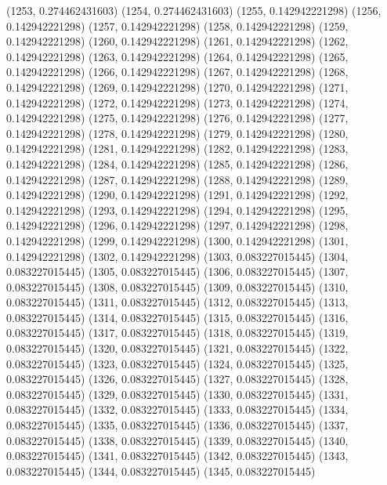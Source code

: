 {					(1253, 0.274462431603)
					(1254, 0.274462431603)
					(1255, 0.142942221298)
					(1256, 0.142942221298)
					(1257, 0.142942221298)
					(1258, 0.142942221298)
					(1259, 0.142942221298)
					(1260, 0.142942221298)
					(1261, 0.142942221298)
					(1262, 0.142942221298)
					(1263, 0.142942221298)
					(1264, 0.142942221298)
					(1265, 0.142942221298)
					(1266, 0.142942221298)
					(1267, 0.142942221298)
					(1268, 0.142942221298)
					(1269, 0.142942221298)
					(1270, 0.142942221298)
					(1271, 0.142942221298)
					(1272, 0.142942221298)
					(1273, 0.142942221298)
					(1274, 0.142942221298)
					(1275, 0.142942221298)
					(1276, 0.142942221298)
					(1277, 0.142942221298)
					(1278, 0.142942221298)
					(1279, 0.142942221298)
					(1280, 0.142942221298)
					(1281, 0.142942221298)
					(1282, 0.142942221298)
					(1283, 0.142942221298)
					(1284, 0.142942221298)
					(1285, 0.142942221298)
					(1286, 0.142942221298)
					(1287, 0.142942221298)
					(1288, 0.142942221298)
					(1289, 0.142942221298)
					(1290, 0.142942221298)
					(1291, 0.142942221298)
					(1292, 0.142942221298)
					(1293, 0.142942221298)
					(1294, 0.142942221298)
					(1295, 0.142942221298)
					(1296, 0.142942221298)
					(1297, 0.142942221298)
					(1298, 0.142942221298)
					(1299, 0.142942221298)
					(1300, 0.142942221298)
					(1301, 0.142942221298)
					(1302, 0.142942221298)
					(1303, 0.083227015445)
					(1304, 0.083227015445)
					(1305, 0.083227015445)
					(1306, 0.083227015445)
					(1307, 0.083227015445)
					(1308, 0.083227015445)
					(1309, 0.083227015445)
					(1310, 0.083227015445)
					(1311, 0.083227015445)
					(1312, 0.083227015445)
					(1313, 0.083227015445)
					(1314, 0.083227015445)
					(1315, 0.083227015445)
					(1316, 0.083227015445)
					(1317, 0.083227015445)
					(1318, 0.083227015445)
					(1319, 0.083227015445)
					(1320, 0.083227015445)
					(1321, 0.083227015445)
					(1322, 0.083227015445)
					(1323, 0.083227015445)
					(1324, 0.083227015445)
					(1325, 0.083227015445)
					(1326, 0.083227015445)
					(1327, 0.083227015445)
					(1328, 0.083227015445)
					(1329, 0.083227015445)
					(1330, 0.083227015445)
					(1331, 0.083227015445)
					(1332, 0.083227015445)
					(1333, 0.083227015445)
					(1334, 0.083227015445)
					(1335, 0.083227015445)
					(1336, 0.083227015445)
					(1337, 0.083227015445)
					(1338, 0.083227015445)
					(1339, 0.083227015445)
					(1340, 0.083227015445)
					(1341, 0.083227015445)
					(1342, 0.083227015445)
					(1343, 0.083227015445)
					(1344, 0.083227015445)
					(1345, 0.083227015445)
}
